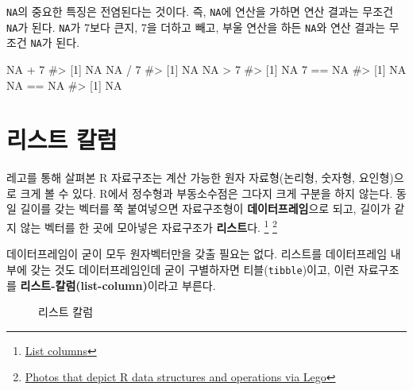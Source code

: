 \documentclass[
  letterpaper,
]{book}
\newenvironment{Shaded}{\begin{snugshade}}{\end{snugshade}}
\newcommand{\CommentTok}[1]{\textcolor[rgb]{0.37,0.37,0.37}{#1}}
\newcommand{\ConstantTok}[1]{\textcolor[rgb]{0.56,0.35,0.01}{#1}}
\newcommand{\DecValTok}[1]{\textcolor[rgb]{0.68,0.00,0.00}{#1}}
\newcommand{\SpecialCharTok}[1]{\textcolor[rgb]{0.37,0.37,0.37}{#1}}
\begin{document}
\texttt{NA}의 중요한 특징은 전염된다는 것이다. 즉, \texttt{NA}에 연산을
가하면 연산 결과는 무조건 \texttt{NA}가 된다. \texttt{NA}가 7보다 큰지,
7을 더하고 빼고, 부울 연산을 하든 \texttt{NA}와 연산 결과는 무조건
\texttt{NA}가 된다.

\begin{Shaded}
\begin{Highlighting}[]
\ConstantTok{NA} \SpecialCharTok{+} \DecValTok{7}
\CommentTok{\#\textgreater{} [1] NA}
\ConstantTok{NA} \SpecialCharTok{/} \DecValTok{7}
\CommentTok{\#\textgreater{} [1] NA}
\ConstantTok{NA} \SpecialCharTok{\textgreater{}} \DecValTok{7}
\CommentTok{\#\textgreater{} [1] NA}
\DecValTok{7} \SpecialCharTok{==} \ConstantTok{NA}
\CommentTok{\#\textgreater{} [1] NA}
\ConstantTok{NA} \SpecialCharTok{==} \ConstantTok{NA}
\CommentTok{\#\textgreater{} [1] NA}
\end{Highlighting}
\end{Shaded}

\section{리스트 칼럼}\label{fp-list-columns}

레고를 통해 살펴본 R 자료구조는 계산 가능한 원자 자료형(논리형, 숫자형,
요인형)으로 크게 볼 수 있다. R에서 정수형과 부동소수점은 그다지 크게
구분을 하지 않는다. 동일 길이를 갖는 벡터를 쭉 붙여넣으면 자료구조형이
\textbf{데이터프레임}으로 되고, 길이가 같지 않는 벡터를 한 곳에 모아넣은
자료구조가 \textbf{리스트}다. \footnote{\href{https://jennybc.github.io/purrr-tutorial/ls13_list-columns.html}{List
  columns}} \footnote{\href{https://github.com/jennybc/lego-rstats}{Photos
  that depict R data structures and operations via Lego}}

데이터프레임이 굳이 모두 원자벡터만을 갖출 필요는 없다. 리스트를
데이터프레임 내부에 갖는 것도 데이터프레임인데 굳이 구별하자면
티블(\texttt{tibble})이고, 이런 자료구조를
\textbf{리스트-칼럼(list-column)}이라고 부른다.

\begin{figure}


\caption{\label{fig-dataframe-list-columns}리스트 칼럼}

\end{figure}%
\end{document}
